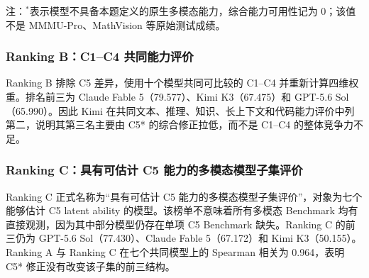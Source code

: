 \begin{table}[htbp]
\centering
\caption{Ranking A：统一 C1--C5* 综合评价}
\label{tab:q1_v12_rankA}
\end{table}
\noindent 注：$^*$表示模型不具备本题定义的原生多模态能力，综合能力可用性记为 0；该值不是 MMMU-Pro、MathVision 等原始测试成绩。

\subsubsection{Ranking B：C1--C4 共同能力评价}
Ranking B 排除 C5 差异，使用十个模型共同可比较的 C1--C4 并重新计算四维权重。排名前三为 Claude Fable 5（79.577）、Kimi K3（67.475）和 GPT-5.6 Sol（65.990）。因此 Kimi 在共同文本、推理、知识、长上下文和代码能力评价中列第二，说明其第三名主要由 C5* 的综合修正拉低，而不是 C1--C4 的整体竞争力不足。

\subsubsection{Ranking C：具有可估计 C5 能力的多模态模型子集评价}
Ranking C 正式名称为“具有可估计 C5 能力的多模态模型子集评价”，对象为七个能够估计 C5 latent ability 的模型。该榜单不意味着所有多模态 Benchmark 均有直接观测，因为其中部分模型仍存在单项 C5 Benchmark 缺失。Ranking C 的前三仍为 GPT-5.6 Sol（77.430）、Claude Fable 5（67.172）和 Kimi K3（50.155）。Ranking A 与 Ranking C 在七个共同模型上的 Spearman 相关为 0.964，表明 C5* 修正没有改变该子集的前三结构。

